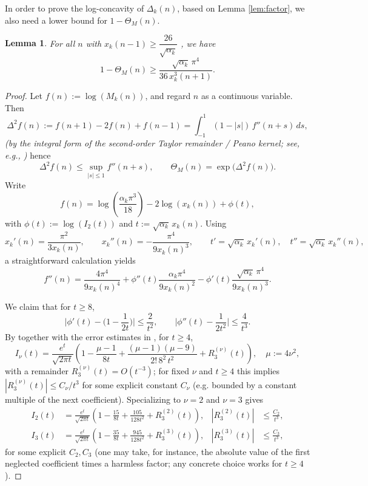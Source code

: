 \documentclass[12pt]{article}
\newtheorem{lem}[thm]{Lemma}
\numberwithin{equation}{section}
\begin{document}
In order to prove the log-concavity of $\Delta_k(n)$, based on Lemma \ref{lem:factor}, we also need a lower bound for $1-\Theta_M(n)$.

\begin{lem}\label{lem:concavity}
For all $n$ with $x_k(n-1)\ge \dfrac{26}{\sqrt{\alpha_k}}$
, we have
\begin{equation}\label{eq:gap}
1-\Theta_M(n) \ge \frac{\sqrt{\alpha_k}\,\pi^4}{36\,x_k^3(n+1)}.
\end{equation}
\end{lem}

\begin{proof}
Let $f(n):=\log \left(M_k(n)\right)$, and regard $n$ as a continuous variable. Then
\[
\Delta^2 f(n):=f(n+1)-2f(n)+f(n-1)
=\int_{-1}^{1}(1-|s|)\,f''(n+s)\,ds,
\]
\emph{(by the integral form of the second-order Taylor remainder / Peano kernel; see, e.g., \cite{Davis-1975})}
hence
\begin{equation}\label{eq:delta2f-upper}
\Delta^2 f(n)\le\sup_{|s|\le 1} f''(n+s),\qquad
\Theta_M(n)=\exp\big(\Delta^2 f(n)\big).
\end{equation}
Write
\[
f(n)=\log\left(\frac{\alpha_k\pi^{3}}{18}\right)-2\log\left( x_k(n)\right)+\phi(t),
\]
with $\phi(t):=\log \left(I_2(t)\right)$ and $t:=\sqrt{\alpha_k}\,x_k(n)$. Using
\[
x_k'(n)=\frac{\pi^2}{3x_k(n)},\qquad x_k''(n)=-\frac{\pi^4}{9x_k(n)^3},\qquad
t'=\sqrt{\alpha_k}\,x_k'(n),\quad t''=\sqrt{\alpha_k}\,x_k''(n),
\]
a straightforward calculation yields
\begin{equation}\label{eq:fpp}
f''(n)=\frac{4\pi^4}{9x_k(n)^4}
+\phi''(t)\frac{\alpha_k\pi^4}{9x_k(n)^2}
-\phi'(t)\frac{\sqrt{\alpha_k}\,\pi^4}{9x_k(n)^3}.
\end{equation}

We claim that for $t\ge8$,
\begin{equation}\label{eq:phi-bds-safe}
\Big|\phi'(t)-\Big(1-\frac{1}{2t}\Big)\Big|\le \frac{2}{t^2},\qquad
\Big|\phi''(t)-\frac{1}{2t^2}\Big|\le \frac{4}{t^3}.
\end{equation}
By \cite[\S10.40(i)-(ii)]{Olver-Lozier-Boisvert-Clark-2010} together with the error estimates in \cite[\S 10.41]{Olver-Lozier-Boisvert-Clark-2010}, for $t\ge4$,
\[
I_\nu(t)=\frac{e^{t}}{\sqrt{2\pi t}}\!\left(1-\frac{\mu-1}{8t}
+\frac{(\mu-1)(\mu-9)}{2!\,8^2\,t^2}+R_{3}^{(\nu)}(t)\right),
\quad \mu:=4\nu^2,
\]
with a remainder $R_{3}^{(\nu)}(t)=O(t^{-3})$; for fixed $\nu$ and $t\ge4$ this implies
$|R_{3}^{(\nu)}(t)|\le C_\nu/t^3$ for some explicit constant $C_\nu$ (e.g. bounded by a constant multiple of the next coefficient).
Specializing to $\nu=2$ and $\nu=3$ gives
\begin{align*}
I_2(t)&=\frac{e^{t}}{\sqrt{2\pi t}}\left(1-\frac{15}{8t}+\frac{105}{128t^2}+R_3^{(2)}(t)\right),
&|R_3^{(2)}(t)|&\le \frac{C_2}{t^3},\\
I_3(t)&=\frac{e^{t}}{\sqrt{2\pi t}}\left(1-\frac{35}{8t}+\frac{945}{128t^2}+R_3^{(3)}(t)\right),
&|R_3^{(3)}(t)|&\le \frac{C_3}{t^3},
\end{align*}
for some explicit $C_2,C_3$ (one may take, for instance, the absolute value of the first neglected coefficient times a harmless factor; any concrete choice works for $t\ge4$).


\end{proof}
\end{document}
